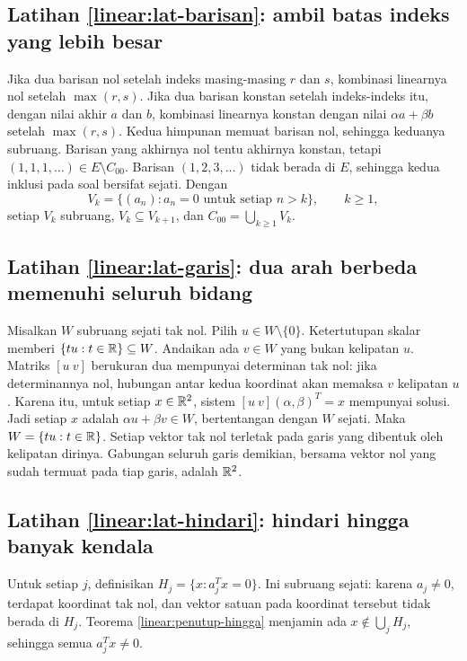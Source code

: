     \subsection*{Latihan \ref{linear:lat-barisan}: ambil batas indeks yang lebih besar}
    Jika dua barisan nol setelah indeks masing-masing $r$ dan $s$,
    kombinasi linearnya nol setelah $\max(r,s)$.
    Jika dua barisan konstan setelah indeks-indeks itu, dengan nilai
    akhir $a$ dan $b$, kombinasi linearnya konstan dengan nilai
    $\alpha a+\beta b$ setelah $\max(r,s)$.
    Kedua himpunan memuat barisan nol, sehingga keduanya subruang.
    Barisan yang akhirnya nol tentu akhirnya konstan, tetapi
    $(1,1,1,\ldots)\in E\setminus C_{00}$.
    Barisan $(1,2,3,\ldots)$ tidak berada di $E$, sehingga kedua
    inklusi pada soal bersifat sejati.
    Dengan
    \[
        V_k=\{(a_n):a_n=0\text{ untuk setiap }n>k\},\qquad k\ge1,
    \]
    setiap $V_k$ subruang, $V_k\subseteq V_{k+1}$, dan
    $C_{00}=\bigcup_{k\ge1}V_k$.

    \subsection*{Latihan \ref{linear:lat-garis}: dua arah berbeda memenuhi seluruh bidang}
    Misalkan $W$ subruang sejati tak nol. Pilih $u\in W\setminus\{0\}$.
    Ketertutupan skalar memberi $\{tu:t\in\mathbb{R}\}\subseteq W$.
    Andaikan ada $v\in W$ yang bukan kelipatan $u$.
    Matriks $[u\ v]$ berukuran dua mempunyai determinan tak nol:
    jika determinannya nol, hubungan antar kedua koordinat
    akan memaksa $v$ kelipatan $u$.
    Karena itu, untuk setiap $x\in\mathbb{R}^2$, sistem
    $[u\ v](\alpha,\beta)^T=x$ mempunyai solusi.
    Jadi setiap $x$ adalah $\alpha u+\beta v\in W$, bertentangan
    dengan $W$ sejati. Maka $W=\{tu:t\in\mathbb{R}\}$.
    Setiap vektor tak nol terletak pada garis yang dibentuk oleh
    kelipatan dirinya. Gabungan seluruh garis demikian, bersama
    vektor nol yang sudah termuat pada tiap garis, adalah $\mathbb{R}^2$.

    \subsection*{Latihan \ref{linear:lat-hindari}: hindari hingga banyak kendala}
    Untuk setiap $j$, definisikan $H_j=\{x:a_j^Tx=0\}$.
    Ini subruang sejati: karena $a_j\ne0$, terdapat koordinat tak nol,
    dan vektor satuan pada koordinat tersebut tidak berada di $H_j$.
    Teorema \ref{linear:penutup-hingga} menjamin ada
    $x\notin\bigcup_j H_j$, sehingga semua $a_j^Tx\ne0$.

